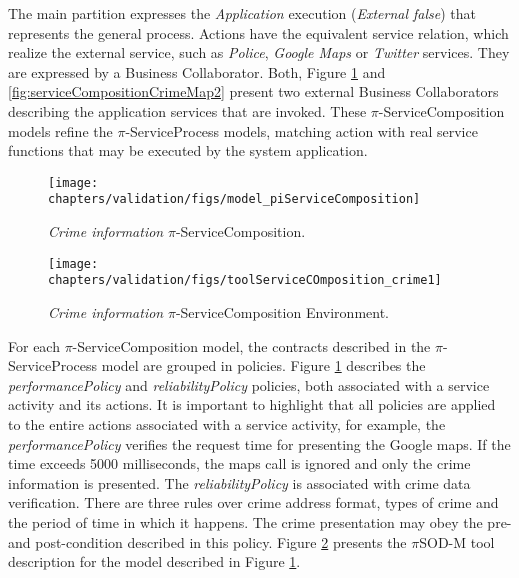 The main partition expresses the \textit{Application} execution
(\textit{External false}) that represents the general process. Actions have the equivalent
service relation, which realize the external service, such as \textit{Police}, \textit{Google Maps} or
\textit{Twitter} services. They are expressed by a {\sc Business Collaborator}.
Both, Figure \ref{fig:serviceCompositionCrimeMap} and
\ref{fig:serviceCompositionCrimeMap2} present two external {\sc Business
Collaborators} describing the application services that are invoked. These
$\pi$-ServiceComposition models refine the $\pi$-ServiceProcess models, matching
action with real service functions that may be executed by the system
application. 

\begin{figure}[ht!]   
\centering
\texttt{[image: chapters/validation/figs/model\_piServiceComposition]}
\caption{\textit{Crime information}
$\pi$-ServiceComposition.}
\label{fig:serviceCompositionCrimeMap} 
\end{figure} 


\begin{figure}[ht!]    
\centering
\texttt{[image: chapters/validation/figs/toolServiceCOmposition\_crime1]}
\caption{\textit{Crime information}
$\pi$-ServiceComposition Environment.}
\label{fig:toolserviceCompositionCrimeMap}
\end{figure}  

For each $\pi$-ServiceComposition model, the contracts described in the
$\pi$-ServiceProcess model are grouped in policies. Figure
\ref{fig:serviceCompositionCrimeMap} describes the \textit{performancePolicy}
and \textit{reliabilityPolicy} policies, both associated with a service activity
and its actions. It is important to highlight that all policies are applied to the
entire actions associated with a service activity, for example, the
\textit{performancePolicy} verifies the request time for presenting the Google
maps. If the time exceeds 5000 milliseconds, the maps call is ignored and only
the crime information is presented. The \textit{reliabilityPolicy} is
associated with crime data verification. There are three rules over crime
address format, types of crime and the period of time in which it happens. The
crime presentation may obey the pre- and post-condition described in this policy. Figure
\ref{fig:toolserviceCompositionCrimeMap} presents the $\pi$SOD-M tool
description for the model described in Figure
\ref{fig:serviceCompositionCrimeMap}.

